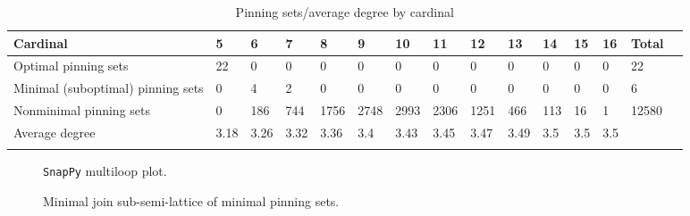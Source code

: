 \documentclass{article}%
\begin{document}
\begin{table}[ht]
	\caption{Pinning sets/average degree by cardinal}
	\centering
	\renewcommand{\arraystretch}{1.5}
	\begin{tabularx}{\textwidth}{lXXXXXXXXXXXXXX}
		\toprule
			Cardinal & 5 & 6 & 7 & 8 & 9 & 10 & 11 & 12 & 13 & 14 & 15 & 16 & Total\\
			\hline
			Optimal pinning sets & 22 & 0 & 0 & 0 & 0 & 0 & 0 & 0 & 0 & 0 & 0 & 0 & 22 \\
			Minimal (suboptimal) pinning sets & 0 & 4 & 2 & 0 & 0 & 0 & 0 & 0 & 0 & 0 & 0 & 0 & 6 \\
			Nonminimal pinning sets & 0 & 186 & 744 & 1756 & 2748 & 2993 & 2306 & 1251 & 466 & 113 & 16 & 1 & 12580 \\
			Average degree & 3.18 & 3.26 & 3.32 & 3.36 & 3.4 & 3.43 & 3.45 & 3.47 & 3.49 & 3.5 & 3.5 & 3.5 &  \\
		\bottomrule \\ 
	\end{tabularx}
\end{table}

\begin{multicols}{2}
\begin{figure}[H]
\centering

\caption{\texttt{SnapPy} multiloop plot.}
\label{fig:tex/img/[[28, 11, 1, 12], [12, 21, 13, 22], [4, 27, 5, 28], [5, 10, 6, 11], [1, 20, 2, 21], [13, 2, 14, 3], [22, 3, 23, 4], [9, 26, 10, 27], [6, 16, 7, 15], [19, 14, 20, 15], [23, 19, 24, 18], [8, 17, 9, 18],.svg}
\end{figure}
\columnbreak

\begin{figure}[H]
\centering
\scalebox{0.8}{}
\caption{Minimal join sub-semi-lattice of minimal pinning sets.}
\label{fig:tex/img/[[28, 11, 1, 12], [12, 21, 13, 22], [4, 27, 5, 28], [5, 10, 6, 11], [1, 20, 2, 21], [13, 2, 14, 3], [22, 3, 23, 4], [9, 26, 10, 27], [6, 16, 7, 15], [19, 14, 20, 15], [23, 19, 24, 18], [8, 17, 9, 18],.pgf}
\end{figure}
\end{multicols}
\end{document}
